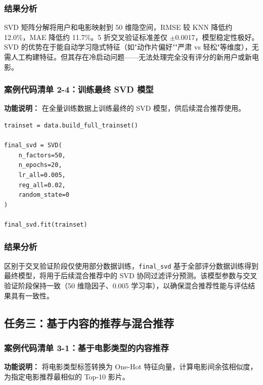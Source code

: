 \documentclass[12pt,a4paper]{ctexart}
\begin{document}
\subsubsection{结果分析}

SVD 矩阵分解将用户和电影映射到 50 维隐空间，RMSE 较 KNN 降低约 12.0\%，MAE 降低约 11.7\%。5 折交叉验证标准差仅 $\pm$0.0017，模型稳定性极好。SVD 的优势在于能自动学习隐式特征（如"动作片偏好""严肃 vs 轻松"等维度），无需人工构建特征。但其存在冷启动问题——无法处理完全没有评分的新用户或新电影。

\subsubsection{案例代码清单 2-4：训练最终 SVD 模型}

\textbf{功能说明：} 在全量训练数据上训练最终的 SVD 模型，供后续混合推荐使用。

\begin{lstlisting}[caption={训练最终 SVD 模型}, label={lst:2-4}]
trainset = data.build_full_trainset()

final_svd = SVD(
    n_factors=50,
    n_epochs=20,
    lr_all=0.005,
    reg_all=0.02,
    random_state=0
)

final_svd.fit(trainset)
\end{lstlisting}

\subsubsection{结果分析}

区别于交叉验证阶段仅使用部分数据训练，\texttt{final\_svd} 基于全部评分数据训练得到最终模型，将用于后续混合推荐中的 SVD 协同过滤评分预测。该模型参数与交叉验证阶段保持一致（50 维隐因子、0.005 学习率），以确保混合推荐性能与评估结果具有一致性。

\subsection{任务三：基于内容的推荐与混合推荐}

\subsubsection{案例代码清单 3-1：基于电影类型的内容推荐}

\textbf{功能说明：} 将电影类型标签转换为 One-Hot 特征向量，计算电影间余弦相似度，为指定电影推荐最相似的 Top-10 影片。
\end{document}
